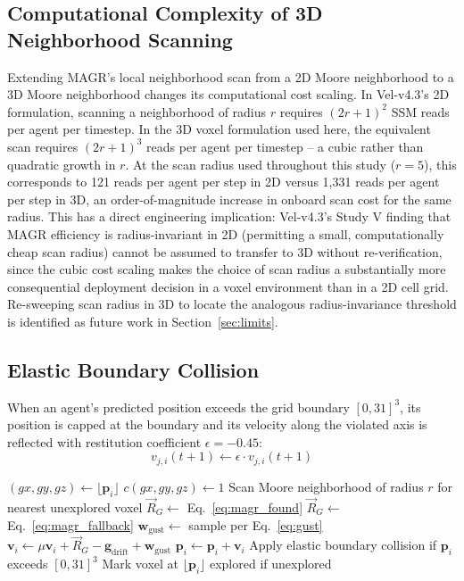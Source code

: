 \documentclass[10pt,journal]{IEEEtran}
\begin{document}
\subsection{Computational Complexity of 3D Neighborhood Scanning}
Extending MAGR's local neighborhood scan from a 2D Moore neighborhood to a
3D Moore neighborhood changes its computational cost scaling. In Vel-v4.3's
2D formulation, scanning a neighborhood of radius $r$ requires
$(2r+1)^2$ SSM reads per agent per timestep. In the 3D voxel formulation
used here, the equivalent scan requires $(2r+1)^3$ reads per agent per
timestep -- a cubic rather than quadratic growth in $r$. At the scan
radius used throughout this study ($r=5$), this corresponds to 121 reads
per agent per step in 2D versus 1{,}331 reads per agent per step in 3D, an
order-of-magnitude increase in onboard scan cost for the same radius. This
has a direct engineering implication: Vel-v4.3's Study V finding that MAGR
efficiency is radius-invariant in 2D (permitting a small, computationally
cheap scan radius) cannot be assumed to transfer to 3D without
re-verification, since the cubic cost scaling makes the choice of scan
radius a substantially more consequential deployment decision in a voxel
environment than in a 2D cell grid. Re-sweeping scan radius in 3D to locate
the analogous radius-invariance threshold is identified as future work in
Section~\ref{sec:limits}.

\subsection{Elastic Boundary Collision}
When an agent's predicted position exceeds the grid boundary $[0,31]^3$,
its position is capped at the boundary and its velocity along the violated
axis is reflected with restitution coefficient $\epsilon=-0.45$:
\begin{equation}
v_{j,i}(t+1) \leftarrow \epsilon \cdot v_{j,i}(t+1)
\end{equation}

\begin{algorithm}[t]
\caption{Vel-v5.5 Per-Agent Update}
\label{alg:vel55}
\begin{algorithmic}[1]
    \State $(gx,gy,gz) \gets \lfloor \mathbf{p}_i \rfloor$
    \State $c(gx,gy,gz) \gets 1$
    \State Scan Moore neighborhood of radius $r$ for nearest unexplored voxel
        \State $\vec{R}_G \gets$ Eq.~\ref{eq:magr_found}
    \Else
        \State $\vec{R}_G \gets$ Eq.~\ref{eq:magr_fallback}
    \EndIf
    \State $\mathbf{w}_{\text{gust}} \gets$ sample per Eq.~\ref{eq:gust}
    \State $\mathbf{v}_i \gets \mu\mathbf{v}_i + \vec{R}_G - \mathbf{g}_{\text{drift}} + \mathbf{w}_{\text{gust}}$
    \State $\mathbf{p}_i \gets \mathbf{p}_i + \mathbf{v}_i$
    \State Apply elastic boundary collision if $\mathbf{p}_i$ exceeds $[0,31]^3$
    \State Mark voxel at $\lfloor \mathbf{p}_i \rfloor$ explored if unexplored
\EndProcedure
\end{algorithmic}
\end{algorithm}
\end{document}
